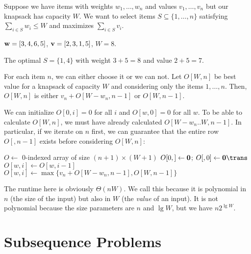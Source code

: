 \begin{problem}[0/1 knapsack]\label{prob:dp:k}
  Suppose we have items with weights $w_1,\dotsc,w_n$
  and values $v_1,\dotsc,v_n$ but our knapsack has capacity $W$.
  We want to select items $S \subseteq \{1,\dotsc,n\}$
  satisfying $\sum_{i \in S} w_i \leq W$
  and maximizes $\sum_{i \in S} v_i$.
\end{problem}

\begin{example}
  $\vb w = [3,4,6,5]$, $\vb v = [2,3,1,5]$, $W = 8$.
\end{example}
\begin{sol}
  The optimal $S = \{1,4\}$ with weight $3+5 = 8$ and value $2+5 = 7$.
\end{sol}

For each item $n$, we can either choose it or we can not.
Let $O[W,n]$ be best value for a knapsack of capacity $W$
and considering only the items $1,\dotsc,n$.
Then, $O[W,n]$ is either $v_n + O[W - w_n, n - 1]$ or $O[W, n - 1]$.

We can initialize $O[0, i] = 0$ for all $i$ and $O[w, 0] = 0$ for all $w$.
To be able to calculate $O[W,n]$, we must have already calculated
$O[W - w_n .. W, n-1]$.
In particular, if we iterate on $n$ first, we can guarantee that
the entire row $O[,n-1]$ exists before considering $O[W,n]$:

\begin{algorithm}[H]
  \caption{}
  \begin{algorithmic}[1]
    \State $O \gets$ 0-indexed array of size $(n+1) \times (W+1)$
    \State $O[0,] \gets \vb{0}$; $O[,0] \gets \vb{0}\trans$
          \State $O[w,i] \gets O[w,i-1]$
        \Else
          \State $O[w,i] \gets \max\{v_n + O[W - w_n, n - 1], O[W, n - 1]\}$
        \EndIf
      \EndFor
    \EndFor
    \State {}
  \end{algorithmic}
\end{algorithm}

The runtime here is obviously $\Theta(nW)$.
We call this  because it is polynomial in
$n$ (the size of the input) but also in $W$ (the \emph{value} of an input).
It is not polynomial because the size parameters are $n$ and $\lg W$,
but we have $n2^{\lg W}$.

\section{Subsequence Problems}

